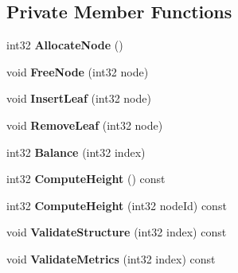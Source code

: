 \subsection*{Private Member Functions}
\begin{DoxyCompactItemize}
\item 
int32 {\bfseries Allocate\+Node} ()\hypertarget{classb2_dynamic_tree_a975879e87073cfddbc6a988f0d426553}{}\label{classb2_dynamic_tree_a975879e87073cfddbc6a988f0d426553}

\item 
void {\bfseries Free\+Node} (int32 node)\hypertarget{classb2_dynamic_tree_a87f1f5d9f4ff97b420300b6ee642ec92}{}\label{classb2_dynamic_tree_a87f1f5d9f4ff97b420300b6ee642ec92}

\item 
void {\bfseries Insert\+Leaf} (int32 node)\hypertarget{classb2_dynamic_tree_a068fd3f29465fb6aaabbfdd6a70e6058}{}\label{classb2_dynamic_tree_a068fd3f29465fb6aaabbfdd6a70e6058}

\item 
void {\bfseries Remove\+Leaf} (int32 node)\hypertarget{classb2_dynamic_tree_a79bde2ff0a8b53b236865fdffebbd030}{}\label{classb2_dynamic_tree_a79bde2ff0a8b53b236865fdffebbd030}

\item 
int32 {\bfseries Balance} (int32 index)\hypertarget{classb2_dynamic_tree_aad4716f3bd40e60ba0624c75f39843fd}{}\label{classb2_dynamic_tree_aad4716f3bd40e60ba0624c75f39843fd}

\item 
int32 {\bfseries Compute\+Height} () const \hypertarget{classb2_dynamic_tree_a2b2ebfdb68cf8ee392c0f6a154f2b927}{}\label{classb2_dynamic_tree_a2b2ebfdb68cf8ee392c0f6a154f2b927}

\item 
int32 {\bfseries Compute\+Height} (int32 node\+Id) const \hypertarget{classb2_dynamic_tree_af9e3afb3381e4e4985e2dc7c42de078a}{}\label{classb2_dynamic_tree_af9e3afb3381e4e4985e2dc7c42de078a}

\item 
void {\bfseries Validate\+Structure} (int32 index) const \hypertarget{classb2_dynamic_tree_a8b3b8e2996d8f193d76cc4e3984b5155}{}\label{classb2_dynamic_tree_a8b3b8e2996d8f193d76cc4e3984b5155}

\item 
void {\bfseries Validate\+Metrics} (int32 index) const \hypertarget{classb2_dynamic_tree_afd80c61809ae0dde0fdad106f7f3f473}{}\label{classb2_dynamic_tree_afd80c61809ae0dde0fdad106f7f3f473}

\end{DoxyCompactItemize}
